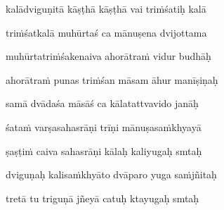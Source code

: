 kalādviguṇitā kāṣṭhā kāṣṭhā vai tri\.mśatiḥ kalā\thinspace{\dandab} \dontdisplaylinenum

tri\.mśatkalā muhūrtaś ca mānuṣena dvijottama \veg\dontdisplaylinenum

muhūrtatri\.mśakenaiva ahorātra\.m vidur budhāḥ\thinspace{\dandab} \dontdisplaylinenum

ahorātra\.m punas tri\.mśan māsam āhur manīṣiṇaḥ \veg\dontdisplaylinenum

samā dvādaśa māsāś ca kālatattvavido janāḥ\thinspace{\dandab} \dontdisplaylinenum

śata\.m varṣasahasrāṇi trīṇi mānuṣasa\.mkhyayā \veg\dontdisplaylinenum

ṣaṣṭi\.m caiva sahasrāṇi kālaḥ kaliyugaḥ smtaḥ\thinspace{\dandab} \dontdisplaylinenum

dviguṇaḥ kalisa\.mkhyāto dvāparo yuga sa\.mjñitaḥ \veg\dontdisplaylinenum

tretā tu triguṇā jñeyā catuḥ ktayugaḥ smtaḥ\thinspace{\dandab} \dontdisplaylinenum

